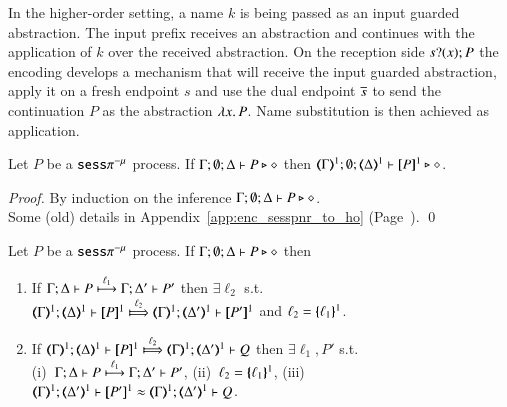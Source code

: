 In the higher-order setting, a name $k$ is being passed as an input
guarded abstraction. The input prefix receives an abstraction and
continues with the application of $k$ over the received abstraction.
On the reception side $\binp{s}{x} P$ 
the encoding develops a mechanism that will receive
the input guarded abstraction, apply it on a fresh endpoint $s$ and use
the dual endpoint $\dual{s}$ to send the continuation $P$ as the abstraction
$\abs{x}{P}$. Name substitution is then achieved as application.

\begin{proposition}
Let $P$ be a  $\sessp^{-\mu}$ process.
If			$\Gamma; \emptyset; \Delta \proves P \hastype \Proc$ then 
			$\mapt{\Gamma}^{1}; \emptyset; \mapt{\Delta}^{1} \proves \map{P}^{1} \hastype \Proc$. 
\end{proposition}

\begin{proof}
By induction on the inference $\Gamma; \emptyset; \Delta \proves P \hastype \Proc$. \\
Some (old) details in Appendix~\ref{app:enc_sesspnr_to_ho} (Page~\pageref{app:enc_sesspnr_to_ho}).
	\qed
\end{proof}

\begin{proposition}
Let $P$ be a  $\sessp^{-\mu}$ process.
If $\Gamma; \emptyset; \Delta \proves P \hastype \Proc$ then
		\begin{enumerate}[1.]
			\item	 
			   If  $\stytra{\Gamma}{\ell_1}{\Delta}{P}{\Delta'}{P'}$
			   then  $\exists \ell_2$ s.t. \\
			    $\wtytra{\mapt{\Gamma}^{1}}{\ell_2}{\mapt{\Delta}^{1}}{\map{P}^{1}}{\mapt{\Delta'}^{1}}{\map{P'}^{1}}$
			    and $\ell_2 = \mapa{\ell_1}^{1}$.
			\item   
			If  $\wtytra{\mapt{\Gamma}^{1}}{\ell_2}{\mapt{\Delta}^{1}}{\map{P}^{1}}{\mapt{\Delta'}^{1}}{Q}$
			   then $\exists \ell_1, P'$ s.t.  \\
			    (i)~$\stytra{\Gamma}{\ell_1}{\Delta}{P}{\Delta'}{P'}$,
			    (ii)~$\ell_2 = \mapa{\ell_1}^{1}$, 
			    (iii)~$\wbb{\mapt{\Gamma}^{1}}{\ell}{\mapt{\Delta'}^{1}}{\map{P'}^{1}}{\mapt{\Delta'}^{1}}{Q}$.
			    \end{enumerate}
\end{proposition}

